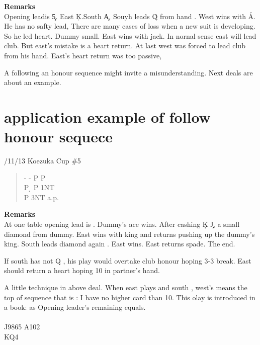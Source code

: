 {\bf Remarks}\\

Opening leadis \c 5. East \c K.South \c A. Souyh
leads \h Q from hand . West wins with \h A. He has
no safty lead, There are many cases of loss when a
new suit is developing. So he led heart.
Dummy small. East wins with jack. In nornal sense 
east will lead club. But east's mistake is a heart return.
At last west was forced to lead club from his hand.
East's heart return was too passive,

A following an honour sequence might invite a misunderstanding.
Next deals are about an example.

\section{application example of follow honour sequece}

/11/13 Koezuka Cup \#5
\begin{quote}
%
  {}%
  {}
  {}%
  {}%
\end{quote}
\begin{quote}
\begin{bidding}
- \> -   \> P  \> P \\
P \d \> P \> 1NT \\
P \> 3NT \> a.p.
\end{bidding}
\end{quote}

{\bf Remarks}\\

At one table opening lead is . Dummy's ace wins.
After cashing \c K \c J, a small diamond from dummy. East wins with king 
and returns  pushing up the dummy's king.
South leads diamond again . East wins. East returns spade. The end.

If south has not \s Q , his play would overtake club honour hoping
3-3 break. East should return a heart hoping 10 in partner's hand.

A little technique in above deal.
When east plays  and south , west's  means the top
of sequence that is : I have no higher card than 10. This olay
is introduced in a book: as Opening leader's remaining equals.\\
\qquad {}\\
J9865 \qquad \qquad A102\\
\qquad \qquad KQ4\\

